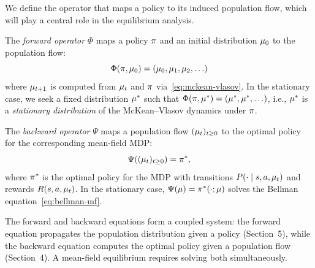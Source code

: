 \documentclass[11pt,a4paper]{article}
\begin{document}
We define the operator that maps a policy to its induced population
flow, which will play a central role in the equilibrium analysis.

\begin{definition}
\label{def:forward-operator}
The \emph{forward operator} $\Phi$ maps a policy $\pi$ and an
initial distribution $\mu_0$ to the population flow:
\[
  \Phi(\pi, \mu_0)
  = (\mu_0, \mu_1, \mu_2, \ldots)
\]
where $\mu_{t+1}$ is computed from $\mu_t$ and
$\pi$ via~\eqref{eq:mckean-vlasov}.  In the stationary case,
we seek a fixed distribution $\mu^*$ such that
$\Phi(\pi, \mu^*) = (\mu^*, \mu^*,
\ldots)$, i.e., $\mu^*$ is a \emph{stationary distribution}
of the McKean--Vlasov dynamics under $\pi$.
\end{definition}

\begin{definition}
\label{def:backward-operator}
The \emph{backward operator} $\Psi$ maps a population flow
$(\mu_t)_{t \geq 0}$ to the optimal policy for the
corresponding mean-field MDP:
\[
  \Psi((\mu_t)_{t \geq 0}) = \pi^*,
\]
where $\pi^*$ is the optimal policy for the MDP with transitions
$P(\cdot \mid s, a, \mu_t)$ and rewards $R(s, a,
\mu_t)$.  In the stationary case,
$\Psi(\mu) = \pi^*(\cdot; \mu)$ solves the
Bellman equation~\eqref{eq:bellman-mf}.
\end{definition}

The forward and backward equations form a coupled system: the
forward equation propagates the population distribution given a
policy (Section~5), while the backward equation computes the
optimal policy given a population flow (Section~4).  A
mean-field equilibrium requires solving both simultaneously.
\end{document}

